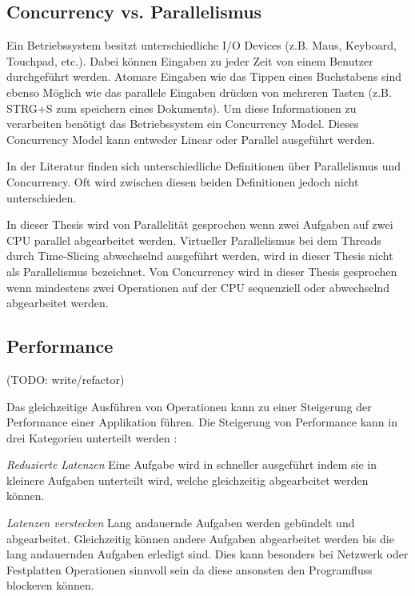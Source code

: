 \subsection{Concurrency vs. Parallelismus}

Ein Betriebssystem besitzt unterschiedliche I/O Devices (z.B. Maus, Keyboard, Touchpad, etc.). Dabei können Eingaben zu jeder Zeit von einem Benutzer durchgeführt werden. Atomare Eingaben wie das Tippen eines Buchstabens sind ebenso Möglich wie das parallele Eingaben drücken von mehreren Tasten (z.B. STRG+S zum speichern eines Dokuments). Um diese Informationen zu verarbeiten benötigt das Betriebssystem ein Concurrency Model. Dieses Concurrency Model kann entweder Linear oder Parallel ausgeführt werden. \cite[]{Pik2013}

In der Literatur finden sich unterschiedliche Definitionen über Parallelismus und Concurrency. Oft wird zwischen diesen beiden Definitionen jedoch nicht unterschieden.

In dieser Thesis wird von Parallelität gesprochen wenn zwei Aufgaben auf zwei CPU parallel abgearbeitet werden. Virtueller Parallelismus bei dem Threads durch Time-Slicing abwechselnd ausgeführt werden, wird in dieser Thesis nicht als Parallelismus bezeichnet. Von Concurrency wird in dieser Thesis gesprochen wenn mindestens zwei Operationen auf der CPU sequenziell oder abwechselnd abgearbeitet werden.





\subsection{Performance}
(TODO: write/refactor)

Das gleichzeitige Ausführen von Operationen kann zu einer Steigerung der Performance einer Applikation führen. Die Steigerung von Performance kann in drei Kategorien unterteilt werden \cite[p. 18]{Can08}:

\emph{Reduzierte Latenzen}
	Eine Aufgabe wird in schneller ausgeführt indem sie in kleinere Aufgaben unterteilt wird, welche gleichzeitig abgearbeitet werden können. \cite[p. 18]{Can08}

\emph{Latenzen verstecken}
	Lang andauernde Aufgaben werden gebündelt und abgearbeitet. Gleichzeitig können andere Aufgaben abgearbeitet werden bis die lang andauernden Aufgaben erledigt sind. Dies kann besonders bei Netzwerk oder Festplatten Operationen sinnvoll sein da diese ansonsten den Programfluss blockeren können.

